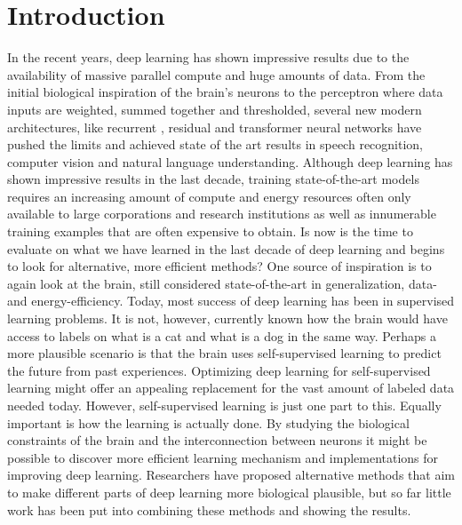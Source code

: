 \documentclass[a4paper,11pt]{article} %
\begin{document}
\newpage
\tableofcontents
\thispagestyle{empty}

\newpage

\setcounter{page}{1}

\section{Introduction}
In the recent years, deep learning has shown impressive results due to the availability of massive parallel compute and huge amounts of data. From the initial biological inspiration of the brain’s neurons to the perceptron where data inputs are weighted, summed together and thresholded, several new modern architectures, like recurrent \cite{lstm}, residual \cite{resnet} and transformer neural networks \cite{transformers} have pushed the limits and achieved state of the art results in speech recognition, computer vision and natural language understanding. Although deep learning has shown impressive results in the last decade, training state-of-the-art models requires an increasing amount of compute and energy resources often only available to large corporations and research institutions as well as innumerable training examples that are often expensive to obtain. Is now is the time to evaluate on what we have learned in the last decade of deep learning and begins to look for alternative, more efficient methods? One source of inspiration is to again look at the brain, still considered state-of-the-art in generalization, data- and energy-efficiency. Today, most success of deep learning has been in supervised learning problems. It is not, however, currently known how the brain would have access to labels on what is a cat and what is a dog in the same way. Perhaps a more plausible scenario is that the brain uses self-supervised learning to predict the future from past experiences. Optimizing deep learning for self-supervised learning might offer an appealing replacement for the vast amount of labeled data needed today. However, self-supervised learning is just one part to this. Equally important is how the learning is actually done. By studying the biological constraints of the brain and the interconnection between neurons it might be possible to discover more efficient learning mechanism and implementations for improving deep learning. Researchers have proposed alternative methods that aim to make different parts of deep learning more biological plausible, but so far little work has been put into combining these methods and showing the results. 
\end{document}
